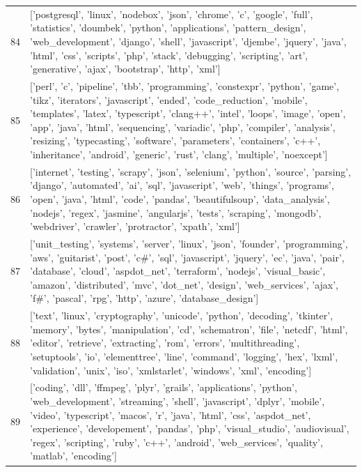 \begin{center}
\begin{longtable}{|p{1.5cm}|p{12.5cm}|}
            84 & ['postgresql', 'linux', 'nodebox', 'json', 'chrome', 'c', 'google', 'full', 'statistics', 'doumbek', 'python', 'applications', 'pattern\_design', 'web\_development', 'django', 'shell', 'javascript', 'djembe', 'jquery', 'java', 'html', 'css', 'scripts', 'php', 'stack', 'debugging', 'scripting', 'art', 'generative', 'ajax', 'bootstrap', 'http', 'xml']  \\ 
            85 & ['perl', 'c', 'pipeline', 'tbb', 'programming', 'constexpr', 'python', 'game', 'tikz', 'iterators', 'javascript', 'ended', 'code\_reduction', 'mobile', 'templates', 'latex', 'typescript', 'clang++', 'intel', 'loops', 'image', 'open', 'app', 'java', 'html', 'sequencing', 'variadic', 'php', 'compiler', 'analysis', 'resizing', 'typecasting', 'software', 'parameters', 'containers', 'c++', 'inheritance', 'android', 'generic', 'rust', 'clang', 'multiple', 'noexcept']  \\ 
            86 & ['internet', 'testing', 'scrapy', 'json', 'selenium', 'python', 'source', 'parsing', 'django', 'automated', 'ai', 'sql', 'javascript', 'web', 'things', 'programs', 'open', 'java', 'html', 'code', 'pandas', 'beautifulsoup', 'data\_analysis', 'nodejs', 'regex', 'jasmine', 'angularjs', 'tests', 'scraping', 'mongodb', 'webdriver', 'crawler', 'protractor', 'xpath', 'xml']  \\ 
            87 & ['unit\_testing', 'systems', 'server', 'linux', 'json', 'founder', 'programming', 'aws', 'guitarist', 'post', 'c\#', 'sql', 'javascript', 'jquery', 'ec', 'java', 'pair', 'database', 'cloud', 'aspdot\_net', 'terraform', 'nodejs', 'visual\_basic', 'amazon', 'distributed', 'mvc', 'dot\_net', 'design', 'web\_services', 'ajax', 'f\#', 'pascal', 'rpg', 'http', 'azure', 'database\_design']  \\ 
            88 & ['text', 'linux', 'cryptography', 'unicode', 'python', 'decoding', 'tkinter', 'memory', 'bytes', 'manipulation', 'cd', 'schematron', 'file', 'netcdf', 'html', 'editor', 'retrieve', 'extracting', 'rom', 'errors', 'multithreading', 'setuptools', 'io', 'elementtree', 'line', 'command', 'logging', 'hex', 'lxml', 'validation', 'unix', 'iso', 'xmlstarlet', 'windows', 'xml', 'encoding']  \\ 
            89 & ['coding', 'dll', 'ffmpeg', 'plyr', 'grails', 'applications', 'python', 'web\_development', 'streaming', 'shell', 'javascript', 'dplyr', 'mobile', 'video', 'typescript', 'macos', 'r', 'java', 'html', 'css', 'aspdot\_net', 'experience', 'developement', 'pandas', 'php', 'visual\_studio', 'audiovisual', 'regex', 'scripting', 'ruby', 'c++', 'android', 'web\_services', 'quality', 'matlab', 'encoding']  \\ 

\end{longtable}
\end{center}
